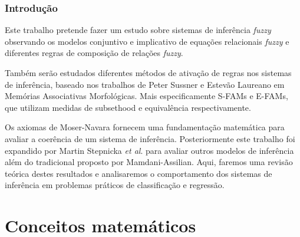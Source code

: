 \documentclass{beamer}
\theoremstyle{definition}
\begin{document}
\begin{frame}
\frametitle{Introdução}
Este trabalho pretende fazer um estudo sobre sistemas de inferência \textit{fuzzy} observando os modelos conjuntivo e implicativo de equações relacionais \textit{fuzzy} e diferentes regras de composição de relações \textit{fuzzy}.\par
Também serão estudados diferentes métodos de ativação de regras nos sistemas de inferência, baseado nos trabalhos de Peter Sussner e Estevão Laureano em Memórias Associativas Morfológicas. Mais especificamente S-FAMs e E-FAMs, que utilizam medidas de subsethood e equivalência respectivamente.\par
Os axiomas de Moser-Navara fornecem uma fundamentação matemática para avaliar a coerência de um sistema de inferência. Posteriormente este trabalho foi expandido por Martin Stepnicka \textit{et al}. para avaliar outros modelos de inferência além do tradicional proposto por Mamdani-Assilian. Aqui, faremos uma revisão teórica destes resultados e analisaremos o comportamento dos sistemas de inferência em problemas práticos de classificação e regressão.
\end{frame}


\section{Conceitos matemáticos}
\end{document}
